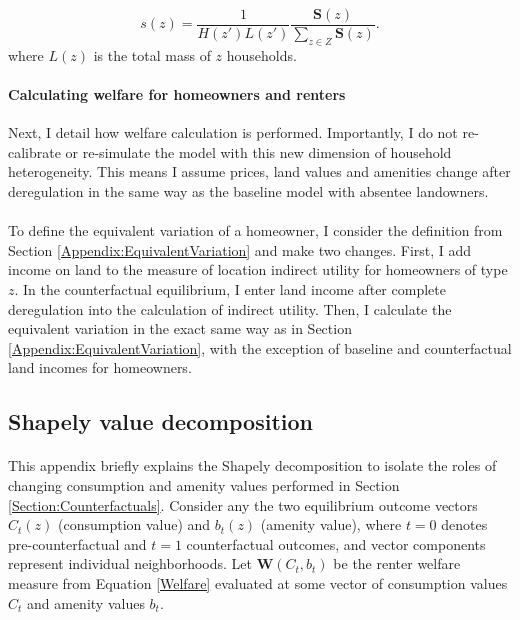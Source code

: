 \documentclass[12pt]{article}
\begin{document}
	\begin{equation*}
		s(z) = \frac{1}{H(z')L(z')}\frac{\boldsymbol{S}(z)}{\sum_{z \in Z}\boldsymbol{S}(z)}.
	\end{equation*}
	where $L(z)$ is the total mass of $z$ households.
	
	
	\paragraph*{Calculating welfare for homeowners and renters}
	Next, I detail how welfare calculation is performed. Importantly, I do not re-calibrate or re-simulate the model with this new dimension of household heterogeneity. This means I assume prices, land values and amenities change after deregulation in the same way as the baseline model with absentee landowners.
	
	\paragraph*{}
	To define the equivalent variation of a homeowner, I consider the definition from Section \ref{Appendix:EquivalentVariation} and make two changes. First, I add income on land to the measure of location indirect utility for homeowners of type $z$. In the counterfactual equilibrium, I enter land income after complete deregulation into the calculation of indirect utility. Then, I calculate the equivalent variation in the exact same way as in Section \ref{Appendix:EquivalentVariation}, with the exception of baseline and counterfactual land incomes for homeowners.
	
	

	\clearpage
	
	\subsection{Shapely value decomposition}\label{Appendix:ShapeDecompDefn}
		\paragraph*{}
		This appendix briefly explains the Shapely decomposition to isolate the roles of changing consumption and amenity values performed in Section \ref{Section:Counterfactuals}. Consider any the two equilibrium outcome vectors $C_{t}(z)$ (consumption value) and $b_{t}(z)$ (amenity value), where $t = 0$ denotes pre-counterfactual and $t = 1$ counterfactual outcomes, and vector components represent individual neighborhoods. Let $\boldsymbol{W}(C_{t}, b_{t})$ be the renter welfare measure from Equation \eqref{Welfare} evaluated at some vector of consumption values $C_{t}$ and amenity values $b_{t}$. 
		
\end{document}

